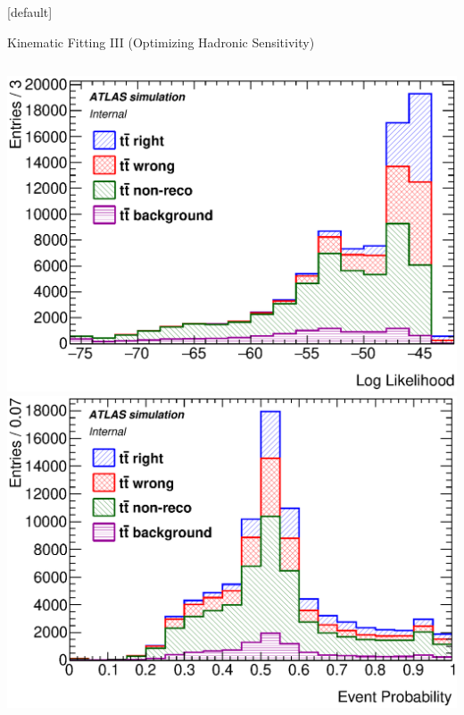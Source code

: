 \documentclass{beamer}
\begin{document}
{  \makeatletter %
  [default]
  \def\beamer@entrycode{\vspace*{-1.075\headheight}}
  \begin{frame}{Kinematic Fitting III (Optimizing Hadronic Sensitivity)}
    \vspace{3pt}
    \begin{columns}
      \includegraphics[width=\textwidth]{../chapters/whel/figures/lh_stack}
      \includegraphics[width=\textwidth]{../chapters/whel/figures/evProb_stack}
    \end{columns}
    \begin{columns}
      \vspace{-5pt}
      \begin{itemize}\fontsize{7}{8}\selectfont

\end{itemize}
\end{columns}
\end{frame}}
\end{document}
